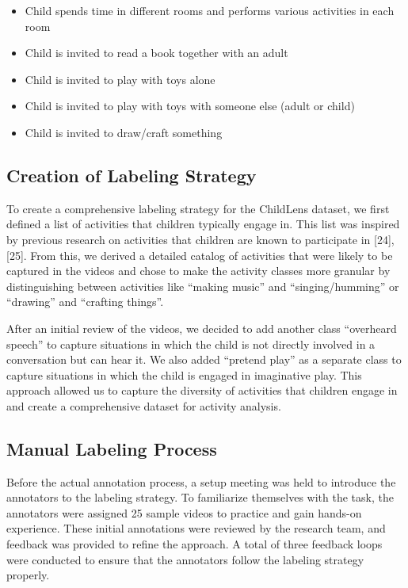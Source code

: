 \documentclass[
  man,floatsintext]{apa6}
\providecommand{\tightlist}{%
  \setlength{\itemsep}{0pt}\setlength{\parskip}{0pt}}
\begin{document}
\begin{itemize}
\tightlist
\item
  Child spends time in different rooms and performs various activities in each room
\item
  Child is invited to read a book together with an adult
\item
  Child is invited to play with toys alone
\item
  Child is invited to play with toys with someone else (adult or child)
\item
  Child is invited to draw/craft something
\end{itemize}

\subsection{Creation of Labeling Strategy}\label{creation-of-labeling-strategy}

To create a comprehensive labeling strategy for the ChildLens dataset, we first defined a list of activities that children typically engage in. This list was inspired by previous research on activities that children are known to participate in {[}24{]}, {[}25{]}. From this, we derived a detailed catalog of activities that were likely to be captured in the videos and chose to make the activity classes more granular by distinguishing between activities like ``making music'' and ``singing/humming'' or ``drawing'' and ``crafting things''.

After an initial review of the videos, we decided to add another class ``overheard speech'' to capture situations in which the child is not directly involved in a conversation but can hear it. We also added ``pretend play'' as a separate class to capture situations in which the child is engaged in imaginative play. This approach allowed us to capture the diversity of activities that children engage in and create a comprehensive dataset for activity analysis.

\subsection{Manual Labeling Process}\label{manual-labeling-process}

Before the actual annotation process, a setup meeting was held to introduce the annotators to the labeling strategy. To familiarize themselves with the task, the annotators were assigned 25 sample videos to practice and gain hands-on experience. These initial annotations were reviewed by the research team, and feedback was provided to refine the approach. A total of three feedback loops were conducted to ensure that the annotators follow the labeling strategy properly.
\end{document}
